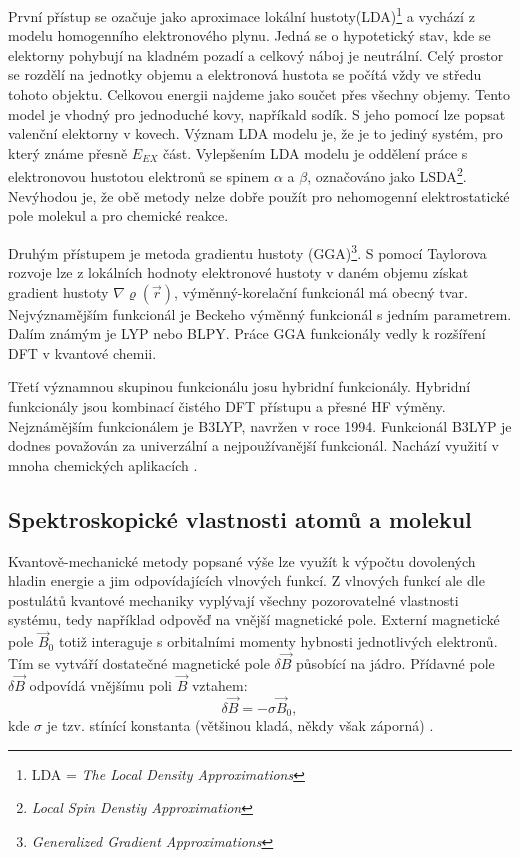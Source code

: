 \documentclass[
  digital, %
  table,   %
  lof,     %
  lot,     %
  oneside,
]{fithesis3}
\begin{document}
První přístup se ozačuje jako aproximace lokální hustoty(LDA)\footnote{LDA = \textit{The Local Density Approximations}} a vychází z modelu homogenního elektronového plynu. Jedná se o hypotetický stav, kde se elektorny pohybují na kladném pozadí a celkový náboj je neutrální. Celý prostor se rozdělí na jednotky objemu a elektronová hustota se počítá vždy ve středu tohoto objektu. Celkovou energii najdeme jako součet přes všechny objemy. Tento model je vhodný pro jednoduché kovy, napříkald sodík. S jeho pomocí lze popsat valenční elektorny v kovech. Význam LDA modelu je, že je to jediný systém, pro který známe přesně $E_{EX}$ část. Vylepšením LDA modelu je oddělení práce s elektronovou hustotou elektronů se spinem $\alpha$ a $\beta$, označováno jako LSDA\footnote{\textit{Local Spin Denstiy Approximation}}. Nevýhodou je, že obě metody nelze dobře použít pro nehomogenní elektrostatické pole molekul a pro chemické reakce.

 Druhým přístupem je metoda gradientu hustoty (GGA)\footnote{\textit{Generalized Gradient Approximations}}. S pomocí Taylorova rozvoje lze z lokálních hodnoty elektronové hustoty v daném objemu získat gradient hustoty $\nabla \varrho(\vec{r})$, výměnný-korelační funkcionál má obecný tvar. Nejvýznamějším funkcionál je Beckeho výměnný funkcionál s jedním parametrem. Dalím známým je LYP nebo BLPY. Práce GGA funkcionály vedly k rozšíření DFT v kvantové chemii.

 Třetí významnou skupinou funkcionálu josu hybridní funkcionály. Hybridní funkcionály jsou kombinací čistého DFT přístupu a přesné HF výměny. Nejznámějším funkcionálem je B3LYP, navržen v roce 1994. Funkcionál B3LYP je dodnes považován za univerzální a nejpoužívanější funkcionál. Nachází využití v mnoha chemických aplikacích \cite{koch2000chemist}.

 \subsection{Spektroskopické vlastnosti atomů a molekul}
 Kvantově-mechanické metody popsané výše lze využít k výpočtu dovolených hladin energie a jim odpovídajících vlnových funkcí. Z vlnových funkcí ale dle postulátů kvantové mechaniky vyplývají všechny pozorovatelné vlastnosti systému, tedy například odpověď na vnější magnetické pole. Externí magnetické pole $\vec{B}_0$ totiž interaguje s orbitalními momenty hybnosti jednotlivých elektronů. Tím se vytváří dostatečné magnetické pole $\delta \vec{B}$ působící na jádro. Přídavné pole $\delta \vec{B}$ odpovídá vnějšímu poli $\vec{B}$ vztahem:
\begin{equation}
  \delta \vec{B} = - \sigma \vec{B}_0,
\end{equation}
kde $\sigma$ je tzv. stínící konstanta (většinou kladá, někdy však záporná) \cite{atkins2010atkins}.
\end{document}
